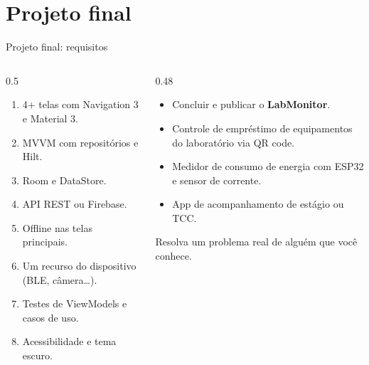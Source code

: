 \documentclass[aspectratio=169,10pt]{beamer}
\begin{document}
\section{Projeto final}

\begin{frame}{Projeto final: requisitos}
  \begin{columns}[T]
    \begin{column}{0.5\textwidth}
      \begin{conceito}
        \begin{enumerate}
          \item 4+ telas com Navigation 3 e Material 3.
          \item MVVM com repositórios e Hilt.
          \item Room e DataStore.
          \item API REST ou Firebase.
          \item Offline nas telas principais.
          \item Um recurso do dispositivo (BLE, câmera\ldots).
          \item Testes de ViewModels e casos de uso.
          \item Acessibilidade e tema escuro.
        \end{enumerate}
      \end{conceito}
    \end{column}
    \begin{column}{0.48\textwidth}
      \begin{projeto}
        \begin{itemize}
          \item Concluir e publicar o \textbf{LabMonitor}.
          \item Controle de empréstimo de equipamentos do laboratório via QR code.
          \item Medidor de consumo de energia com ESP32 e sensor de corrente.
          \item App de acompanhamento de estágio ou TCC.
        \end{itemize}
      \end{projeto}
      \begin{dica}
        Resolva um problema real de alguém que você conhece.
      \end{dica}
    \end{column}
  \end{columns}
\end{frame}
\end{document}
